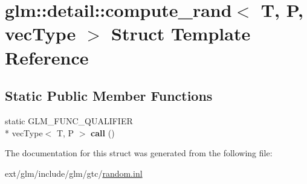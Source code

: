 \hypertarget{structglm_1_1detail_1_1compute__rand}{\section{glm\-:\-:detail\-:\-:compute\-\_\-rand$<$ T, P, vec\-Type $>$ Struct Template Reference}
\label{structglm_1_1detail_1_1compute__rand}
}
\subsection*{Static Public Member Functions}
\begin{DoxyCompactItemize}
\item 
\hypertarget{structglm_1_1detail_1_1compute__rand_ab66bca4a567d6f4aa01031d669d270d3}{static G\-L\-M\-\_\-\-F\-U\-N\-C\-\_\-\-Q\-U\-A\-L\-I\-F\-I\-E\-R \\*
vec\-Type$<$ T, P $>$ {\bfseries call} ()}\label{structglm_1_1detail_1_1compute__rand_ab66bca4a567d6f4aa01031d669d270d3}

\end{DoxyCompactItemize}


The documentation for this struct was generated from the following file\-:\begin{DoxyCompactItemize}
\item 
ext/glm/include/glm/gtc/\hyperlink{random_8inl}{random.\-inl}\end{DoxyCompactItemize}

